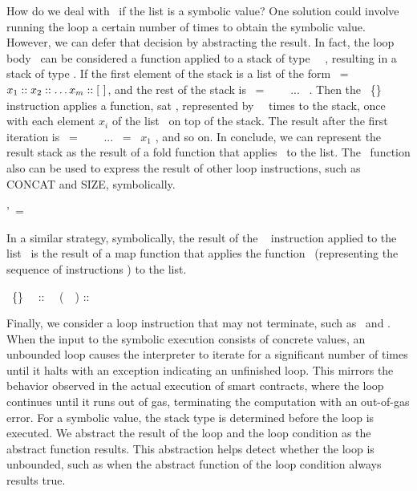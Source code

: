 \documentclass[runningheads]{llncs}
\begin{document}
How do we deal with \ITER\ if the list is a symbolic value? One solution could involve running the loop a certain number of times to obtain the symbolic value. However, we can defer that decision by abstracting the result. In fact, the loop body \INSTRUCTIONONE\ can be considered a function applied to a stack
of type \TY\ \STACKCONCAT\ \TYA,
resulting in a stack of type \TYA. If the first element of
the stack is a list of the form \LIST\ = $x_1 :: x_2 ::
\dots x_m ::  [\ ]$, and the rest of the stack is \STACKZERO\ =
\StackOne\  \STACKCONCAT\ \StackTwo\ \STACKCONCAT\ ... \STACKCONCAT\
\StackN. Then the \ITER\ \{\INSTRUCTIONONE\} instruction applies a 
function, sat \F, represented by \INSTRUCTIONONE\ \M\ times to the stack, once
with each element $x_i$ of the list \LIST\ on top of the stack. The result after 
the first iteration is \STACKONE\ = \StackOneOne\  \STACKCONCAT\
\StackTwoOne\ \STACKCONCAT\ ... \STACKCONCAT\ \StackNOne = \F\ $x_1$
\STACKZERO, and so on. In conclude, we can represent the result stack as the result of a fold function that applies  \F\ to the list. The \FOLD\ function also can be used to express the result of other loop instructions, such as CONCAT and SIZE, symbolically. 
\begin{mathpar}
\STACK'\ =  \FOLD\ \F\ \STACKZERO\ \LIST
\end{mathpar}

In a similar strategy, symbolically, the result of the \MAP\ {\INSTRUCTIONONE} instruction applied to the list \LIST\ is the result of a map function that applies the function \F\ (representing the sequence of instructions \INSTRUCTIONONE) to the list. 
\begin{mathpar}
\MAP\ \{\INSTRUCTIONONE\} \Slash\ \LIST\ :: \STACK\ \SRightarrow\ (\FMAP\ \F\ \LIST) ::  \STACK
\end{mathpar}

Finally, we consider a loop instruction that may not terminate, such as \LOOP\ and \LOOPLEFT. 
When the input to the symbolic execution consists of concrete values, an unbounded loop causes the interpreter to iterate for a significant number of times until it halts with an exception indicating an unfinished loop. This mirrors the behavior observed in the actual execution of smart contracts, where the loop continues until it runs out of gas, terminating the computation with an out-of-gas error. For a symbolic value, the stack type is determined before the loop is executed. We abstract the result of the loop  and the loop condition as the abstract function results. 
This abstraction helps detect whether the loop is unbounded, such as when the abstract function of the loop condition always results  true. 
\end{document}
